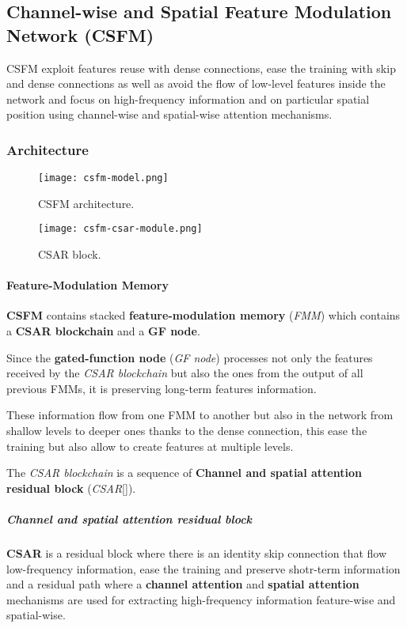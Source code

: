 \subsection{Channel-wise and Spatial Feature Modulation Network (CSFM\cite{CSFM})}\label{csfm}

CSFM exploit features reuse with dense connections, ease the training with skip and dense connections as well as avoid the flow of low-level features inside the network and focus on high-frequency information  and on particular spatial position using channel-wise and spatial-wise attention mechanisms.

\subsubsection{Architecture}
\begin{figure}
    \centering
    \texttt{[image: csfm-model.png]}
    \caption{CSFM architecture.}\label{csfm:architecture}
\end{figure}

\begin{figure}
    \centering
    \texttt{[image: csfm-csar-module.png]}
    \caption{CSAR block.}\label{csfm:csar}
\end{figure}

\paragraph{Feature-Modulation Memory}
\textbf{CSFM} contains stacked \textbf{feature-modulation memory} (\textit{FMM}) which contains a \textbf{CSAR blockchain} and a \textbf{GF node}.

Since the \textbf{gated-function node} (\textit{GF node}) processes not only the features received by the \textit{CSAR blockchain} but also the ones from the output of all previous FMMs, it is preserving long-term features information.

These information flow from one FMM to another but also in the network from shallow levels to deeper ones thanks to the dense connection, this ease the training but also allow to create features at multiple levels.

The \textit{CSAR blockchain} is a sequence of \textbf{Channel and spatial attention residual block} (\textit{CSAR}[]).

\subparagraph{Channel and spatial attention residual block} \textbf{CSAR} is a residual block where there is an identity skip connection that flow low-frequency information, ease the training and preserve shotr-term information and a residual path where a \textbf{channel attention} and \textbf{spatial attention} mechanisms are used for extracting high-frequency information feature-wise and spatial-wise.

